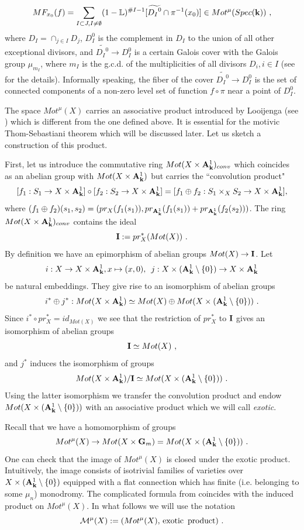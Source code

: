 \documentclass[12pt]{article}
\begin{document}
$$MF_{x_0}(f)=\sum_{I\subset J, I\ne \emptyset}(1-{\mathbb L})^{\#I-1}[\widetilde{{D_I}^0} \cap \pi^{-1}(x_0)]\in Mot^\mu
(Spec({\bf k}))\,\,,$$
where $D_I=\cap_{j\in I}D_j$, $D_I^0$ is the complement in $D_I$ to the union of all other exceptional divisors, 
and $\widetilde{{D_I}^0}\to D_I^0$ is a certain Galois cover with the Galois group  $\mu_{m_I}$, where $m_I$ is the g.c.d.
of the multiplicities of all divisors $D_i,i\in I$ (see \cite{DeLo1} for the details). Informally speaking, the fiber of the cover
 $\widetilde{{D_I}^0}\to D_I^0$ is the set of connected components of a non-zero level set of function $f\circ \pi$ near a point of  $D_I^0$.

The space
$Mot^{\mu}(X)$ carries an associative product introduced by Looijenga (see \cite{Loo}) which is different from the one defined above. It is essential for the motivic Thom-Sebastiani theorem which will be discussed later.
Let us sketch  a construction of this product.

First, let us introduce the commutative ring $Mot(X\times {\bf A}^1_{{\bf k}})_{conv}$ which coincides as an abelian group with $Mot(X\times {\bf A}^1_{{\bf k}})$ but carries the ``convolution product"
$$[f_1: S_1\to X\times {\bf A}^1_{{\bf k}}]\circ[f_2: S_2\to X\times {\bf A}^1_{{\bf k}}]=[f_1\oplus f_2:S_1\times_X S_2\to X\times {\bf A}^1_{{\bf k}}],$$
where $(f_1\oplus f_2)(s_1,s_2)=(pr_X(f_1(s_1)),pr_{{\bf A}^1_{{\bf k}}}(f_1(s_1)) +pr_{{\bf A}^1_{{\bf k}}}(f_2(s_2)))$.
The ring $Mot(X\times {\bf A}^1_{{\bf k}})_{conv}$ contains the ideal 
$${\bf I}:=pr_X^{\ast}(Mot(X))\,\,.$$
By definition we have an epimorphism of abelian groups $Mot(X)\to {\bf I}$. Let 
$$i:X\to X\times {\bf A}^1_{{\bf k}}, x\mapsto (x,0),\,\,\,j:X\times ({\bf A}^1_{{\bf k}}\setminus \{0\})\to X\times {\bf A}^1_{{\bf k}}$$ be natural embeddings. They give rise to an isomorphism of abelian groups 
$$i^{\ast}\oplus j^{\ast}:Mot(X\times {\bf A}^1_{{\bf k}})\simeq Mot(X)\oplus Mot( X\times ({\bf A}^1_{{\bf k}}\setminus \{0\}))\,\,.$$ Since $i^{\ast}\circ pr_X^{\ast}=id_{Mot(X)}$ we see that the restriction of
$pr_X^{\ast}$ to ${\bf I}$ gives an isomorphism of abelian groups 
$${\bf I}\simeq Mot(X)\,\,,$$ and $j^{\ast}$ induces the isomorphism of groups 
$$Mot(X\times {\bf A}^1_{{\bf k}})/{\bf I}\simeq Mot( X\times ({\bf A}^1_{{\bf k}}\setminus \{0\}))\,\,.$$ Using the latter isomorphism we transfer the convolution product and endow $Mot( X\times ({\bf A}^1_{{\bf k}}\setminus \{0\}))$ with an associative product which we will call {\it exotic}.

Recall that we have a homomorphism of groups 
$$Mot^{\mu}(X)\to Mot(X\times {\bf G}_m)=Mot( X\times ({\bf A}^1_{{\bf k}}\setminus \{0\}))\,\,.$$ One can check that the image of $Mot^{\mu}(X)$ is closed under the exotic product.
Intuitively, the image consists of isotrivial families of varieties over $X\times ({\bf A}^1_{{\bf k}}\setminus\{0\})$
equipped with a flat connection which has  finite (i.e. belonging to some $\mu_n$) monodromy. The complicated formula from \cite{Loo} coincides with the induced product on $Mot^{\mu}(X)$.
In what follows we will use the notation
$${\cal M}^{\mu}(X):=(Mot^{\mu}(X), \mathrm{\, exotic\,\,\,product})\,\,. $$ 
\end{document}
